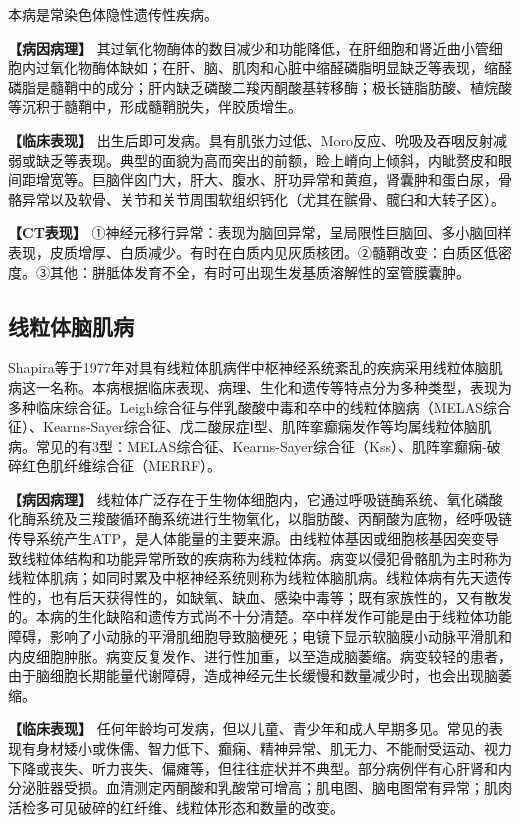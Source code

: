 本病是常染色体隐性遗传性疾病。

\textbf{【病因病理】}
其过氧化物酶体的数目减少和功能降低，在肝细胞和肾近曲小管细胞内过氧化物酶体缺如；在肝、脑、肌肉和心脏中缩醛磷脂明显缺乏等表现，缩醛磷脂是髓鞘中的成分；肝内缺乏磷酸二羧丙酮酸基转移酶；极长链脂肪酸、植烷酸等沉积于髓鞘中，形成髓鞘脱失，伴胶质增生。

\textbf{【临床表现】}
出生后即可发病。具有肌张力过低、Moro反应、吮吸及吞咽反射减弱或缺乏等表现。典型的面貌为高而突出的前额，睑上嵴向上倾斜，内眦赘皮和眼间距增宽等。巨脑伴囟门大，肝大、腹水、肝功异常和黄疸，肾囊肿和蛋白尿，骨骼异常以及软骨、关节和关节周围软组织钙化（尤其在髌骨、髋臼和大转子区）。

\textbf{【CT表现】}
①神经元移行异常：表现为脑回异常，呈局限性巨脑回、多小脑回样表现，皮质增厚、白质减少。有时在白质内见灰质核团。②髓鞘改变：白质区低密度。③其他：胼胝体发育不全，有时可出现生发基质溶解性的室管膜囊肿。

\subsection{线粒体脑肌病}

Shapira等于1977年对具有线粒体肌病伴中枢神经系统紊乱的疾病采用线粒体脑肌病这一名称。本病根据临床表现、病理、生化和遗传等特点分为多种类型，表现为多种临床综合征。Leigh综合征与伴乳酸酸中毒和卒中的线粒体脑病（MELAS综合征）、Kearns-Sayer综合征、戊二酸尿症Ⅰ型、肌阵挛癫痫发作等均属线粒体脑肌病。常见的有3型：MELAS综合征、Kearns-Sayer综合征（Kss）、肌阵挛癫痫-破碎红色肌纤维综合征（MERRF）。

\textbf{【病因病理】}
线粒体广泛存在于生物体细胞内，它通过呼吸链酶系统、氧化磷酸化酶系统及三羧酸循环酶系统进行生物氧化，以脂肪酸、丙酮酸为底物，经呼吸链传导系统产生ATP，是人体能量的主要来源。由线粒体基因或细胞核基因突变导致线粒体结构和功能异常所致的疾病称为线粒体病。病变以侵犯骨骼肌为主时称为线粒体肌病；如同时累及中枢神经系统则称为线粒体脑肌病。线粒体病有先天遗传性的，也有后天获得性的，如缺氧、缺血、感染中毒等；既有家族性的，又有散发的。本病的生化缺陷和遗传方式尚不十分清楚。卒中样发作可能是由于线粒体功能障碍，影响了小动脉的平滑肌细胞导致脑梗死；电镜下显示软脑膜小动脉平滑肌和内皮细胞肿胀。病变反复发作、进行性加重，以至造成脑萎缩。病变较轻的患者，由于脑细胞长期能量代谢障碍，造成神经元生长缓慢和数量减少时，也会出现脑萎缩。

\textbf{【临床表现】}
任何年龄均可发病，但以儿童、青少年和成人早期多见。常见的表现有身材矮小或侏儒、智力低下、癫痫、精神异常、肌无力、不能耐受运动、视力下降或丧失、听力丧失、偏瘫等，但往往症状并不典型。部分病例伴有心肝肾和内分泌脏器受损。血清测定丙酮酸和乳酸常可增高；肌电图、脑电图常有异常；肌肉活检多可见破碎的红纤维、线粒体形态和数量的改变。

